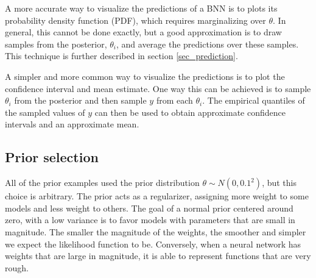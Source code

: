 \documentclass[12pt]{article}
\begin{document}
{A more accurate way to visualize the predictions of a BNN is to plots its probability density function (PDF), which requires marginalizing over $\theta$. In general, this cannot be done exactly, but a good approximation is to draw samples from the posterior, $\theta_i$, and average the predictions over these samples. This technique is further described in section \ref{sec_prediction}.

\begin{figure}[ht]
\centering
{}
\caption{}
\label{fig_1d_predictions_pdf}
\end{figure}

A simpler and more common way to visualize the predictions is to plot the confidence interval and mean estimate. One way this can be achieved is to sample $\theta_i$ from the posterior and then sample $y$ from each $\theta_i$. The empirical quantiles of the sampled values of $y$ can then be used to obtain approximate confidence intervals and an approximate mean.

\begin{figure}[ht]
\centering
{}
\caption{}
\label{fig_1d_predictions_ci}
\end{figure}

\subsection{Prior selection}

All of the prior examples used the prior distribution $\theta \sim N(0, 0.1^2)$, but this choice is arbitrary. The prior acts as a regularizer, assigning more weight to some models and less weight to others. The goal of a normal prior centered around zero, with a low variance is to favor models with parameters that are small in magnitude. The smaller the magnitude of the weights, the smoother and simpler we expect the likelihood function to be. Conversely, when a neural network has weights that are large in magnitude, it is able to represent functions that are very rough.

}
\end{document}
